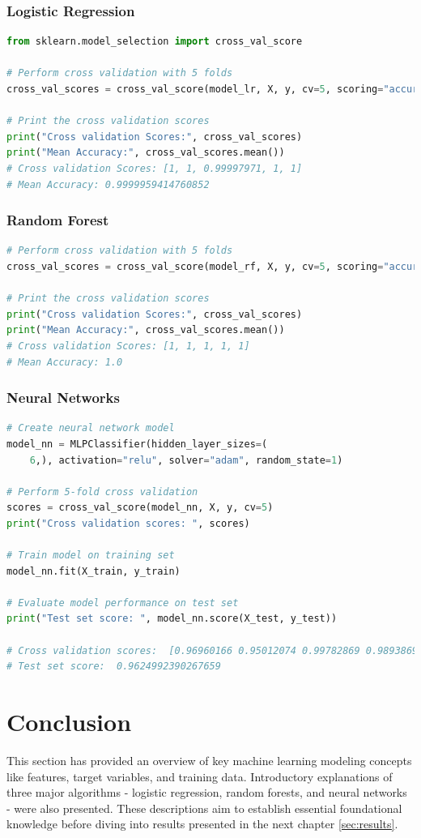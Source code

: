 \subsubsection{Logistic Regression}
\begin{lstlisting}[language=Python]
from sklearn.model_selection import cross_val_score

# Perform cross validation with 5 folds
cross_val_scores = cross_val_score(model_lr, X, y, cv=5, scoring="accuracy")

# Print the cross validation scores
print("Cross validation Scores:", cross_val_scores)
print("Mean Accuracy:", cross_val_scores.mean())
# Cross validation Scores: [1, 1, 0.99997971, 1, 1]
# Mean Accuracy: 0.9999959414760852
\end{lstlisting}

\subsubsection{Random Forest}
\begin{lstlisting}[language=Python]
# Perform cross validation with 5 folds
cross_val_scores = cross_val_score(model_rf, X, y, cv=5, scoring="accuracy")

# Print the cross validation scores
print("Cross validation Scores:", cross_val_scores)
print("Mean Accuracy:", cross_val_scores.mean())
# Cross validation Scores: [1, 1, 1, 1, 1]
# Mean Accuracy: 1.0
\end{lstlisting}

\subsubsection{Neural Networks}
\begin{lstlisting}[language=Python]
# Create neural network model
model_nn = MLPClassifier(hidden_layer_sizes=(
	6,), activation="relu", solver="adam", random_state=1)

# Perform 5-fold cross validation
scores = cross_val_score(model_nn, X, y, cv=5)
print("Cross validation scores: ", scores)

# Train model on training set
model_nn.fit(X_train, y_train)

# Evaluate model performance on test set
print("Test set score: ", model_nn.score(X_test, y_test))

# Cross validation scores:  [0.96960166 0.95012074 0.99782869 0.98938696 0.92516082]
# Test set score:  0.9624992390267659
\end{lstlisting}
	

\section{Conclusion}
\label{sec:model:conclusion}



This section has provided an overview of key machine learning modeling concepts like features, target variables, and training data. Introductory explanations of three major algorithms - logistic regression, 
random forests, and neural networks - were also presented. 
These descriptions aim to establish essential foundational knowledge before diving into results presented in the next chapter \ref{sec:results}.